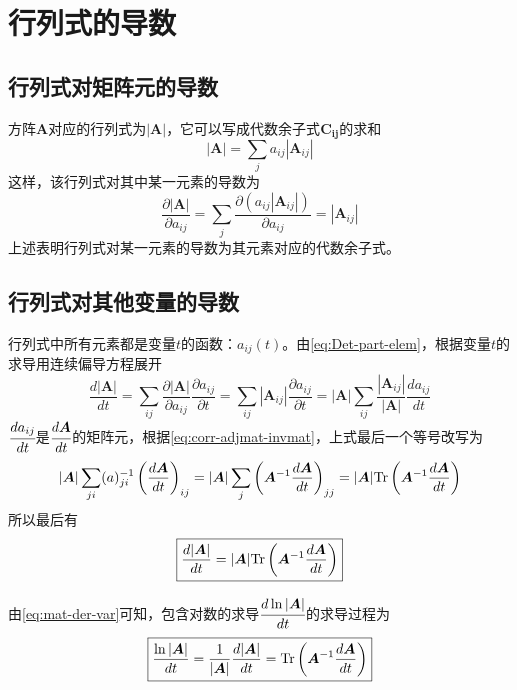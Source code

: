 \section{行列式的导数}

\subsection{行列式对矩阵元的导数}
方阵$\bm{A}$对应的行列式为$|\bm{A}|$，它可以写成代数余子式$\bm{C_{ij}}$的求和
\begin{equation}
    |\bm{A}| = \sum_{j} a_{ij} |\bm{A}_{ij}|
    \label{eq:rep-cofactor}
\end{equation}
这样，该行列式对其中某一元素的导数为
\begin{equation}\boxed{
    \frac{\partial |\bm{A}|}{\partial a_{ij}} = \sum_{j} \frac{\partial \left(a_{ij} |\bm{A}_{ij}|\right)}{\partial a_{ij}} = |\bm{A}_{ij}|
    \label{eq:Det-part-elem}
}\end{equation}
上述表明行列式对某一元素的导数为其元素对应的代数余子式。

\subsection{行列式对其他变量的导数}
行列式中所有元素都是变量$t$的函数：$a_{ij}(t)$。由\cref{eq:Det-part-elem}，根据变量$t$的求导用连续偏导方程展开
\begin{equation*}
    \frac{d |\bm{A}|}{d t} = \sum_{ij} \frac{\partial |\bm{A}|}{\partial a_{ij}} \frac{\partial a_{ij}}{\partial t} = \sum_{ij} |\bm{A}_{ij}| \frac{\partial a_{ij}}{\partial t} = |\bm{A}| \sum_{ij} \frac{|\bm{A}_{ij}|}{|\bm{A}|} \frac{d a_{ij}}{d t}
\end{equation*}
$\cfrac{d a_{ij}}{d t}$是$\cfrac{d \bm{A}}{d t}$的矩阵元，根据\cref{eq:corr-adjmat-invmat}，上式最后一个等号改写为
\begin{equation*}
    |\bm{A}| \sum_{ji} (a)^{-1}_{ji} \left(\frac{d \bm{A}}{d t}\right)_{ij}
    =
    |\bm{A}| \sum_{j} \left( \bm{A}^{-1} \frac{d \bm{A}}{d t} \right)_{jj}
    = 
    |\bm{A}| {\rm Tr} \left( \bm{A}^{-1} \frac{d \bm{A}}{d t} \right)
\end{equation*}
所以最后有
\begin{equation}\boxed{
    \frac{d |\bm{A}|}{d t} = 
    |\bm{A}| {\rm Tr} \left( \bm{A}^{-1} \frac{d \bm{A}}{d t} \right)
    \label{eq:mat-der-var}
}\end{equation}

由\cref{eq:mat-der-var}可知，包含对数的求导$\cfrac{d \ln{|\bm{A}|}}{d t}$的求导过程为
\begin{equation}\boxed{
    \frac{\ln{|\bm{A}|}}{d t} = \frac{1}{|\bm{A}|} \frac{d |\bm{A}|}{d t} = {\rm Tr} \left( \bm{A}^{-1} \frac{d \bm{A}}{d t} \right)
    \label{eq:det-log-dev}
}\end{equation}

